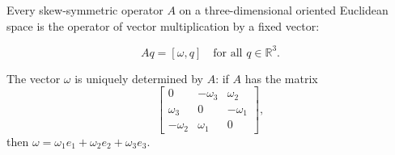 Every skew-symmetric operator $A$ on a three-dimensional oriented Euclidean space is the operator of vector multiplication by a fixed vector:

$$Aq = [\omega, q] \quad \text{for all } q \in \mathbb{R}^3.$$

The vector $\omega$ is uniquely determined by $A$: if $A$ has the matrix
$$\begin{bmatrix} 0 & -\omega_3 & \omega_2 \\ \omega_3 & 0 & -\omega_1 \\ -\omega_2 & \omega_1 & 0 \end{bmatrix},$$
then $\omega = \omega_1 e_1 + \omega_2 e_2 + \omega_3 e_3$.